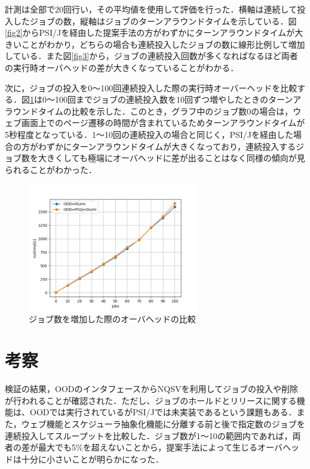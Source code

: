 \documentclass[a4paper,oneside,twocolumn,notitlepage,dvipdfmx]{jsarticle}
\begin{document}
計測は全部で20回行い，その平均値を使用して評価を行った．横軸は連続して投入したジョブの数，縦軸はジョブのターンアラウンドタイムを示している．図\ref{fig2}からPSI/Jを経由した提案手法の方がわずかにターンアラウンドタイムが大きいことがわかり，どちらの場合も連続投入したジョブの数に線形比例して増加している．また図\ref{fig3}から，ジョブの連続投入回数が多くなればなるほど両者の実行時オーバヘッドの差が大きくなっていることがわかる．\par
次に，ジョブの投入を0～100回連続投入した際の実行時オーバーヘッドを比較する．図\ref{fig5}は0～100回までジョブの連続投入数を10回ずつ増やしたときのターンアラウンドタイムの比較を示した．このとき，グラフ中のジョブ数0の場合は，ウェブ画面上でのページ遷移の時間が含まれているためターンアラウンドタイムが5秒程度となっている．1～10回の連続投入の場合と同じく，PSI/Jを経由した場合の方がわずかにターンアラウンドタイムが大きくなっており，連続投入するジョブ数を大きくしても極端にオーバヘッドに差が出ることはなく同様の傾向が見られることがわかった．\par

\begin{figure}[h]
  \centering
  \includegraphics[width=75mm]{./fig/100jobs.png}
  \caption{ジョブ数を増加した際のオーバヘッドの比較}
  \label{fig5}
\end{figure}

\section{考察}
検証の結果，OODのインタフェースからNQSVを利用してジョブの投入や削除が行われることが確認された．ただし、ジョブのホールドとリリースに関する機能は、OODでは実行されているがPSI/Jでは未実装であるという課題もある．また，ウェブ機能とスケジューラ抽象化機能に分離する前と後で指定数のジョブを連続投入してスループットを比較した．ジョブ数が1～10の範囲内であれば，両者の差が最大でも5\%を超えないことから，提案手法によって生じるオーバヘッドは十分に小さいことが明らかになった．\par
\end{document}
